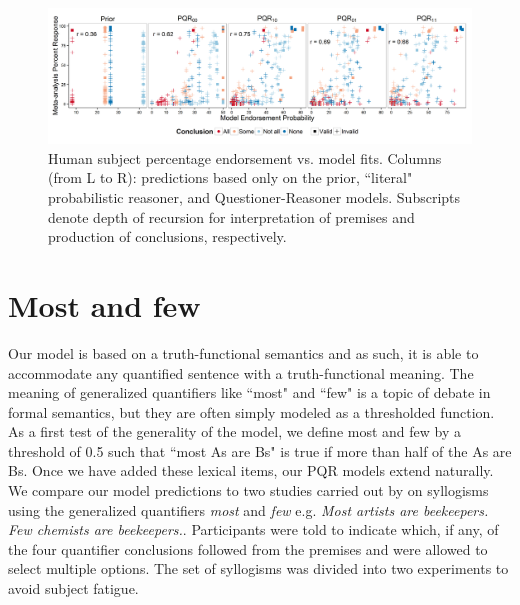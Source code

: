 \documentclass[10pt,letterpaper]{article}
\begin{document}

\begin{figure}[t!] %
\centering
	\subfigure
		\centering
  \includegraphics[width=\textwidth]{fig2_multiScatter_n6_br25_alpha2}
  \caption{Human subject percentage endorsement vs. model fits.
  Columns (from L to R): predictions based only on the prior, ``literal" probabilistic reasoner, and Questioner-Reasoner models. Subscripts denote depth of recursion for interpretation of premises and production of conclusions, respectively.}
  \label{fig:megaScatter}

\end{figure}






\section{Most and few}

Our model is based on a truth-functional semantics and as such, it is able to accommodate any quantified sentence with a truth-functional meaning. The meaning of generalized quantifiers like ``most" and ``few" is a topic of debate in formal semantics, but they are often simply modeled as a thresholded function. As a first test of the generality of the model, we define most and few by a threshold of 0.5 such that ``most As are Bs" is true if more than half of the As are Bs. Once we have added these lexical items, our PQR models extend naturally. 
%
We compare our model predictions to two studies carried out by  on syllogisms using the generalized quantifiers \emph{most} and \emph{few} e.g. \emph{Most artists are beekeepers. Few chemists are beekeepers.}. Participants were told to indicate which, if any, of the four quantifier conclusions followed from the premises and were allowed to select multiple options.
%
The set of syllogisms was divided into two experiments to avoid subject fatigue.
\end{document}
